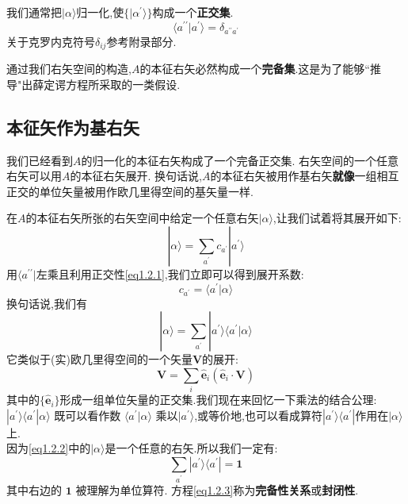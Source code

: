 \documentclass[lang=cn,newtx,10pt,scheme=chinese,thmcnt=section]{elegantbook}
\begin{document}
我们通常把$|\alpha\rangle$归一化,使$\{|\alpha^{'} \rangle\}$构成一个\textbf{正交集}.
\begin{equation}\label{eq1.2.1}
	\langle a^{\prime\prime}| a^{\prime}\rangle=\delta_{a^{\prime\prime}a^{\prime}}
\end{equation}
关于克罗内克符号$\delta_{ij}$参考附录部分.

通过我们右矢空间的构造,$A$的本征右矢必然构成一个\textbf{完备集}.这是为了能够``推导"出薛定谔方程所采取的一类假设.
\subsection*{本征矢作为基右矢}
我们已经看到$A$的归一化的本征右矢构成了一个完备正交集. 右矢空间的一个任意右矢可以用$A$的本征右矢展开. 换句话说,$A$的本征右矢被用作基右矢\textbf{就像}一组相互正交的单位矢量被用作欧几里得空间的基矢量一样.

在$A$的本征右矢所张的右矢空间中给定一个任意右矢$|\alpha\rangle$,让我们试着将其展开如下:
\begin{equation}
	|\alpha\rangle=\sum_{a^{\prime}}c_{a^{\prime}}|a^{\prime}\rangle
\end{equation}
用$\langle a^{\prime\prime}|$左乘且利用正交性\ref{eq1.2.1},我们立即可以得到展开系数:
$$c_{a^{\prime}}=\langle a^{\prime}|\alpha\rangle$$
换句话说,我们有
\begin{equation}\label{eq1.2.2}
	|\alpha\rangle=\sum_{a^{\prime}}|a^{\prime}\rangle\langle a^{\prime}|\alpha\rangle
\end{equation}
它类似于(实)欧几里得空间的一个矢量$\mathbf{V}$的展开:
$$\mathbf{V}=\sum_i\hat{\mathbf{e}}_i(\hat{\mathbf{e}}_i\cdot\mathbf{V})$$
其中的$\{\hat{\mathbf{e}}_i\}$形成一组单位矢量的正交集.我们现在来回忆一下乘法的结合公理:$|a^\prime\rangle\langle a^{\prime}|\alpha\rangle$ 既可以看作数 $\langle a^\prime|\alpha\rangle$ 乘以$|a^\prime\rangle$,或等价地,也可以看成算符$|a^\prime\rangle\langle a^\prime|$作用在$|\alpha\rangle$上.\\
因为\ref{eq1.2.2}中的$|\alpha\rangle$是一个任意的右矢.所以我们一定有:
\begin{equation}\label{eq1.2.3}
	\sum_{a^{\prime}}|a^{\prime}\rangle\langle a^{\prime}|=\mathbf{1}
\end{equation}
其中右边的 $\mathbf{1}$ 被理解为单位算符. 方程\ref{eq1.2.3}称为\textbf{完备性关系}或\textbf{封闭性}.
\end{document}
